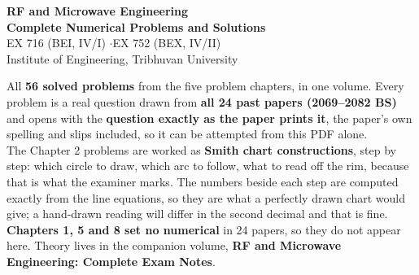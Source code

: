 \documentclass[10pt]{article}
\begin{document}
\thispagestyle{empty}
\vspace*{2.0cm}
\begin{center}
  {\Huge\bfseries\color{acc} RF and Microwave Engineering}\\[6pt]
  {\LARGE\bfseries Complete Numerical Problems and Solutions}\\[14pt]
  {\large\color{sub} EX 716 (BEI, IV/I) \quad$\cdot$\quad EX 752 (BEX, IV/II)}\\[3pt]
  {\color{sub} Institute of Engineering, Tribhuvan University}\\[20pt]
  \begin{minipage}{0.78\textwidth}
    \color{sub}\small
    All \textbf{56 solved problems} from the five problem chapters, in one volume. Every
    problem is a real question drawn from \textbf{all 24 past papers (2069--2082 BS)} and
    opens with the \textbf{question exactly as the paper prints it}, the paper's own
    spelling and slips included, so it can be attempted from this PDF alone.\\[8pt]
    The Chapter 2 problems are worked as \textbf{Smith chart constructions}, step by step:
    which circle to draw, which arc to follow, what to read off the rim, because that is
    what the examiner marks. The numbers beside each step are computed exactly from the
    line equations, so they are what a perfectly drawn chart would give; a hand-drawn
    reading will differ in the second decimal and that is fine.\\[8pt]
    \textbf{Chapters 1, 5 and 8 set no numerical} in 24 papers, so they do not appear here.
    Theory lives in the companion volume, \textbf{RF and Microwave Engineering: Complete
    Exam Notes}.
  \end{minipage}
\end{center}

\vspace{10pt}

\end{document}
